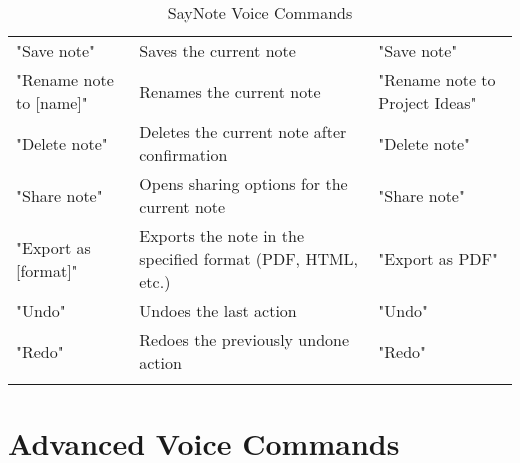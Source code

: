 \begin{longtable}{p{}p{}p{}}
"Save note" & Saves the current note & "Save note" \\
"Rename note to [name]" & Renames the current note & "Rename note to Project Ideas" \\
"Delete note" & Deletes the current note after confirmation & "Delete note" \\
"Share note" & Opens sharing options for the current note & "Share note" \\
"Export as [format]" & Exports the note in the specified format (PDF, HTML, etc.) & "Export as PDF" \\
\midrule

"Undo" & Undoes the last action & "Undo" \\
"Redo" & Redoes the previously undone action & "Redo" \\

\bottomrule
\caption{SayNote Voice Commands}
\label{tab:voice_commands}
\end{longtable}

\section{Advanced Voice Commands}

